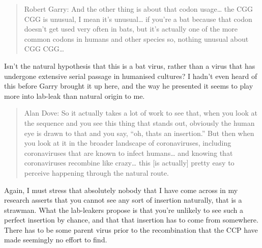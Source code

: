 \documentclass[11pt]{article}
\begin{document}
\begin{quote}
Robert Garry: And the other thing is about that codon usage\ldots{} the CGG CGG is unusual, I mean it's unusual\ldots{} if you're a bat because that codon doesn't get used very often in bats, but it's actually one of the more common codons in humans and other species so, nothing unusual about CGG CGG\ldots{}
\end{quote}
Isn't the natural hypothesis that this is a bat virus, rather than a virus that has undergone extensive serial passage in humanised cultures? I hadn't even heard of this before Garry brought it up here, and the way he presented it seems to play more into lab-leak than natural origin to me.

\begin{quote}
Alan Dove: So it actually takes a lot of work to see that, when you look at the sequence and you see this thing that stands out, obviously the human eye is drawn to that and you say, ``oh, thats an insertion.'' But then when you look at it in the broader landscape of coronaviruses, including coronaviruses that are known to infect humans\ldots{} and knowing that coronaviruses recombine like crazy\ldots{} this [is actually] pretty easy to perceive happening through the natural route.
\end{quote}
Again, I must stress that absolutely nobody that I have come across in my research asserts that you cannot see any sort of insertion naturally, that is a strawman. What the lab-leakers propose is that you're unlikely to see such a perfect insertion by chance, and that that insertion has to come from somewhere. There has to be some parent virus prior to the recombination that the CCP have made seemingly no effort to find.
\end{document}
